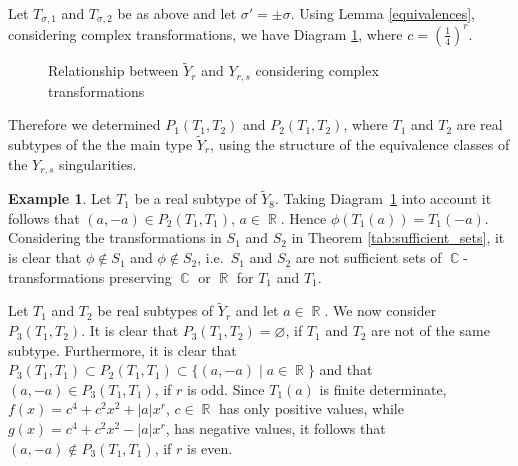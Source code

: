 \documentclass[noend]{amsproc}
\theoremstyle{definition}
\newtheorem{example}[theorem]{Example}
\DeclareMathOperator{\R}{\mathbb{R}}
\DeclareMathOperator{\C}{\mathbb{C}}
\begin{document}
Let $T_{\sigma,1}$ and $T_{\sigma,2}$ be as above and let $\sigma'=\pm\sigma$.
Using Lemma \ref{equivalences}, considering complex transformations, we have
Diagram \ref{Yr_commuting_diagram}, where $c=\left(\frac{1}{4}\right)^r$.

\begin{figure}
\caption{Relationship between $\widetilde Y_r$ and $Y_{r,s}$ considering
complex transformations}
\label{Yr_commuting_diagram}
\end{figure}
Therefore we determined $P_1(T_1,T_2)$ and $P_2(T_1,T_2)$, where $T_1$ and
$T_2$ are real subtypes of the the main type $\widetilde Y_r$, using the
structure of the equivalence classes of the $Y_{r,s}$ singularities.

\begin{example}\label{tab:counter_example_Yr}
Let $T_1$ be a real subtype of $\widetilde Y_8$. Taking
Diagram~\ref{Yr_commuting_diagram} into account it follows that
$(a,-a)\in P_2(T_1,T_1)$, $a\in\R$. Hence $\phi(T_1(a))=T_1(-a)$. Considering
the transformations in $S_1$ and $S_2$ in Theorem \ref{tab:sufficient_sets}, it
is clear that $\phi\not\in S_1$ and $\phi\not\in S_2$, i.e.~$S_1$ and $S_2$ are
not sufficient sets of $\C$-transformations preserving $\C$ or $\R$ for $T_1$
and $T_1$.
\end{example}

Let $T_1$ and $T_2$ be real subtypes of $\widetilde Y_r$ and let $a\in\R$. We
now consider $P_3(T_1,T_2)$. It is clear that $P_3(T_1,T_2)=\varnothing$, if
$T_1$ and $T_2$ are not of the same subtype. Furthermore, it is clear that
$P_3(T_1,T_1)\subset P_2(T_1,T_1)\subset\{(a,-a)\mid a\in\R\}$ and that
$(a,-a)\in P_3(T_1,T_1)$, if $r$ is odd. Since $T_1(a)$ is finite determinate,
$f(x)=c^4+c^2x^2+|a|x^r$, $c\in\R$ has only positive values, while
$g(x)=c^4+c^2x^2-|a|x^r$, has negative values, it follows that
$(a,-a)\not\in P_3(T_1,T_1)$, if $r$ is even.
\end{document}
